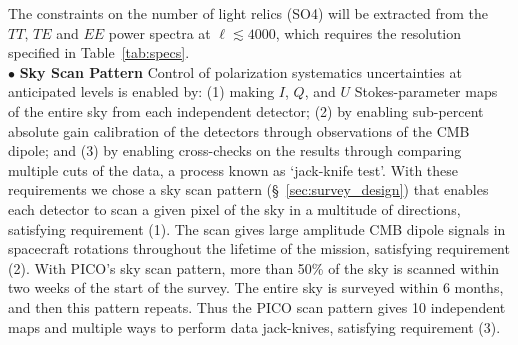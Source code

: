 \documentclass[PICOReport.tex]{subfiles}
\begin{document}
The constraints on the number of light relics (SO4) will be extracted from the $TT,\,TE$ and $EE$ power spectra at $\ell \lesssim 4000$, which requires the resolution specified in Table~\ref{tab:specs}. \\
%
$\bullet$ {\bf Sky Scan Pattern} \hspace{0.1in} 
Control of polarization systematics uncertainties at anticipated levels is enabled by: (1) making $I$, $Q$, and $U$ Stokes-parameter maps of the entire sky from each independent detector; (2) by enabling sub-percent absolute gain calibration of the detectors through observations of the CMB dipole; and (3) by enabling cross-checks on the results through comparing multiple cuts of the data, a process known as `jack-knife test'.   With these requirements we chose a sky scan pattern (\S~\ref{sec:survey_design}) that enables each detector to scan a given pixel of the sky in a multitude of directions, satisfying requirement (1). The scan gives large amplitude CMB dipole signals in spacecraft rotations throughout the lifetime of the mission, satisfying requirement (2). With PICO's sky scan pattern, more than 50\% of the sky is  scanned within two weeks of the start of the survey. The entire sky is surveyed within 6 months, and then this pattern repeats. Thus the PICO scan pattern gives 10 independent maps and multiple ways to perform data jack-knives, satisfying requirement (3).   

 
\end{document}
